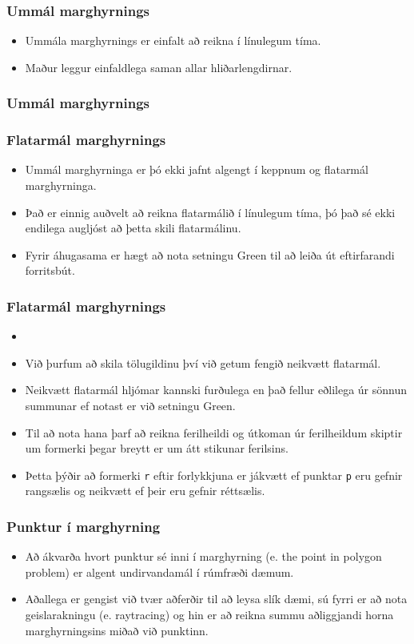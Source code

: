 \documentclass{beamer}
\newcommand\env[2]
{
	\begin{#1}
	#2
	\end{#1}
}
\newcommand\code[1]{\tiny}
\begin{document}
\env{frame}
{
	\frametitle{Ummál marghyrnings}
	\env{itemize}
	{
		\item<1-> Ummála marghyrnings er einfalt að reikna í línulegum tíma.
		\item<2-> Maður leggur einfaldlega saman allar hliðarlengdirnar.
	}
}

\begin{frame}[fragile]
	\frametitle{Ummál marghyrnings}
	\code{ummal.h}
\end{frame}

\env{frame}
{
	\frametitle{Flatarmál marghyrnings}
	\env{itemize}
	{
		\item<1-> Ummál marghyrninga er þó ekki jafnt algengt í keppnum og flatarmál marghyrninga.
		\item<2-> Það er einnig auðvelt að reikna flatarmálið í línulegum tíma, þó það sé ekki
			endilega augljóst að þetta skili flatarmálinu.
		\item<3-> Fyrir áhugasama er hægt að nota setningu Green til að leiða út eftirfarandi forritsbút.
	}
}

\env{frame}
{
	\frametitle{Flatarmál marghyrnings}
	\env{itemize}
	{
		\item<1-> \code{flatarmal.h}
		\item<2-> Við þurfum að skila tölugildinu því við getum fengið neikvætt flatarmál.
		\item<3-> Neikvætt flatarmál hljómar kannski furðulega en það fellur eðlilega úr sönnun summunar
			ef notast er við setningu Green.
		\item<4-> Til að nota hana þarf að reikna ferilheildi og útkoman úr ferilheildum skiptir
			um formerki þegar breytt er um átt stikunar ferilsins.
		\item<5-> Þetta þýðir að formerki \texttt{r} eftir forlykkjuna er jákvætt ef punktar \texttt{p} 
			eru gefnir rangsælis og neikvætt ef þeir eru gefnir réttsælis.
	}
}

\env{frame}
{
	\frametitle{Punktur í marghyrning}
	\env{itemize}
	{
		\item<1-> Að ákvarða hvort punktur sé inni í marghyrning (e. the point in polygon problem) er algent undirvandamál
			í rúmfræði dæmum.
		\item<2-> Aðallega er gengist við tvær aðferðir til að leysa slík dæmi, sú fyrri er að nota geislarakningu 
			(e. raytracing) og hin er að reikna summu aðliggjandi horna marghyrningsins miðað við punktinn.
	}
}
\end{document}
